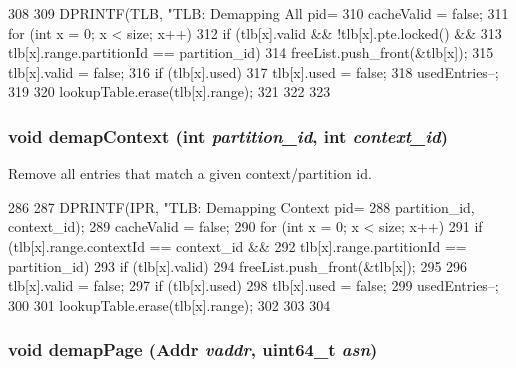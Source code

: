 \begin{DoxyCode}
308 {
309     DPRINTF(TLB, "TLB: Demapping All pid=%
310     cacheValid = false;
311     for (int x = 0; x < size; x++) {
312         if (tlb[x].valid && !tlb[x].pte.locked() &&
313                 tlb[x].range.partitionId == partition_id) {
314             freeList.push_front(&tlb[x]);
315             tlb[x].valid = false;
316             if (tlb[x].used) {
317                 tlb[x].used = false;
318                 usedEntries--;
319             }
320             lookupTable.erase(tlb[x].range);
321         }
322     }
323 }
\end{DoxyCode}
\hypertarget{classSparcISA_1_1TLB_af7e91d9c8e43607b3064697810576e28}{
\subsubsection[{demapContext}]{\setlength{\rightskip}{0pt plus 5cm}void demapContext (int {\em partition\_\-id}, \/  int {\em context\_\-id})}}
\label{classSparcISA_1_1TLB_af7e91d9c8e43607b3064697810576e28}
Remove all entries that match a given context/partition id. 


\begin{DoxyCode}
286 {
287     DPRINTF(IPR, "TLB: Demapping Context pid=%
288             partition_id, context_id);
289     cacheValid = false;
290     for (int x = 0; x < size; x++) {
291         if (tlb[x].range.contextId == context_id &&
292             tlb[x].range.partitionId == partition_id) {
293             if (tlb[x].valid) {
294                 freeList.push_front(&tlb[x]);
295             }
296             tlb[x].valid = false;
297             if (tlb[x].used) {
298                 tlb[x].used = false;
299                 usedEntries--;
300             }
301             lookupTable.erase(tlb[x].range);
302         }
303     }
304 }
\end{DoxyCode}
\hypertarget{classSparcISA_1_1TLB_a2d698ff909513b48a1263f8a5440e067}{
\subsubsection[{demapPage}]{\setlength{\rightskip}{0pt plus 5cm}void demapPage ({\bf Addr} {\em vaddr}, \/  uint64\_\-t {\em asn})}}
\label{classSparcISA_1_1TLB_a2d698ff909513b48a1263f8a5440e067}


